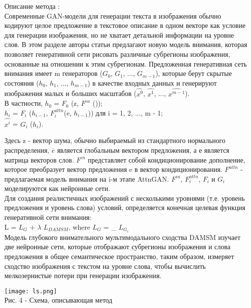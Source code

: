 \documentclass{article}
\begin{document}
Описание метода :\\
Современные GAN-модели для генерации текста в изображения обычно кодируют целое предложение в текстовое описание в одном векторе как условие для генерации изображения, но не хватает детальной информации на уровне слов. В этом разделе авторы статьи предлагают новую модель внимания, которая позволяет генеративной сети рисовать различные субрегионы изображения, основанные на отношении к этим субрегионам.
Предложенная генеративная сеть внимания имеет m генераторов ($G_{0}$, $G_{1}$, ..., $G_{m - 1}$), которые берут скрытые состояния ($h_{0}$, $h_{1}$, ..., $h_{m - 1}$) в качестве входных данных и генерируют изображения малых и больших масштабов ($\hat{x^0}$, $\hat{x^1}$, ..., $\hat{x^{m - 1}}$).\\
В частности,
$h_{0}$ = $F_{0}$ (z, $F^{ca}$ ());\\
$h_{i}$ = $F_{i}$ ($h_{i - 1}$, $F^{attn}_{i} $(e, $h_{i - 1}$)) для i = 1, 2, ..., m - 1;\\
$\hat{x^i}$ = $G_{i}$ ($h_{i}$).

Здесь z - вектор шума, обычно выбираемый из стандартного нормального распределения, $\overline{e}$ является глобальным вектором предложения, а е является матрица векторов слов. $F^{ca}$ представляет собой кондиционирование
дополнение, которое преобразует вектор предложения e в
вектор кондиционирования. $F^{attn}$ - предлагаемая модель внимания на i-м этапе AttnGAN. $F^{ca}$, $F^{attn}_{i} $, $F_{i}$ и $G_{i}$ моделируются как нейронные сети.\\
Для создания реалистичных изображений с несколькими уровнями (т.е.
уровень предложения и уровень слова) условий, определяется конечная целевая функция генеративной сети внимания:\\
L = $L_{G}$ + $\lambda$ $L_{DAMSM}$, where $L_{G}$ = \sum_{} 
 $L_{G_{i}}$\\
 
 Модель глубокого внимательного мультимодального сходства
DAMSM изучает две нейронные сети, которые отображают субрегионы изображения и слова предложения в общее семантическое пространство, таким образом, измеряет сходство изображения с текстом на уровне слова, чтобы вычислить мелкозернистые потери при генерации изображения.
\\
 \begin{center} 
  \texttt{[image: ls.png]}
  \\
  \caption*{Рис. 4 - Схема, описывающая метод}
  \end{center} 
\end{document}
